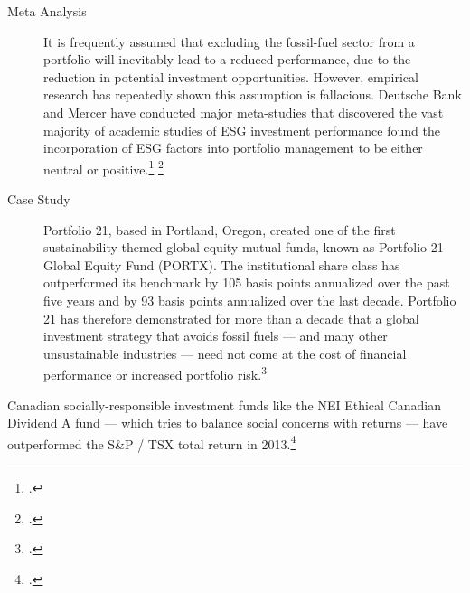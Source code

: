 \begin{description}
\begin{quote}
\end{quote}
  \item[Meta Analysis] It is frequently assumed that excluding the fossil-fuel sector from a portfolio will inevitably lead to a reduced performance, due to the reduction in potential investment opportunities.
  However, empirical research has repeatedly shown this assumption is fallacious.
  Deutsche Bank and Mercer have conducted major meta-studies that discovered the vast majority of academic studies of ESG investment performance found the incorporation of ESG factors into portfolio management to be either neutral or positive.\footcite{DeutscheBankSI} \footcite{MercerRI}
  \item[Case Study] Portfolio 21, based in Portland, Oregon, created one of the first sustainability-themed global equity mutual funds, known as Portfolio 21 Global Equity Fund (PORTX). The institutional share class has outperformed its benchmark by 105 basis points annualized over the past five years and by 93 basis points annualized over the last decade. Portfolio 21 has therefore demonstrated for more than a decade that a global investment strategy that avoids fossil fuels --- and many other unsustainable industries --- need not come at the cost of financial performance or increased portfolio risk.\footcite{FossilFreeInvesting}
\end{description}
Canadian socially-responsible investment funds like the NEI Ethical Canadian Dividend A fund --- which tries to balance social concerns with returns --- have outperformed the S\&P / TSX total return in 2013.\footcite[][]{HoldTheirOwn}



